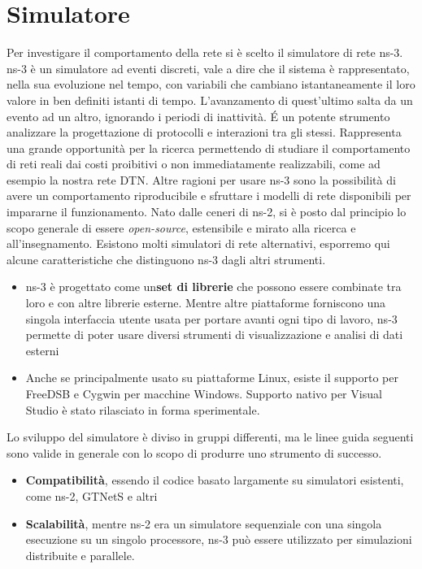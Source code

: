 \documentclass[12pt,a4paper,oneside]{book}
\begin{document}
		\section{Simulatore}
		Per investigare il comportamento della rete si è scelto il simulatore di rete ns-3. 
		ns-3 è un simulatore ad eventi discreti, vale a dire che il sistema è rappresentato, nella sua evoluzione nel tempo, con variabili che cambiano istantaneamente il loro valore in ben definiti istanti di tempo. L'avanzamento di quest'ultimo salta da un evento ad un altro, ignorando i periodi di inattività. \'E un potente strumento analizzare la progettazione di protocolli e interazioni tra gli stessi. Rappresenta una grande opportunità per la ricerca permettendo di studiare il comportamento di reti reali dai costi proibitivi o non immediatamente realizzabili, come ad esempio la nostra rete DTN. Altre ragioni per usare ns-3 sono la possibilità di avere un comportamento riproducibile e sfruttare i modelli di rete disponibili per impararne il funzionamento. Nato dalle ceneri di ns-2, si è posto dal principio lo scopo generale di essere {\it open-source}, estensibile e mirato alla ricerca e all'insegnamento.  Esistono molti simulatori di rete alternativi, esporremo qui alcune caratteristiche che distinguono ns-3 dagli altri strumenti.
		
		\begin{itemize}
			\item ns-3 è progettato come un{\bf set di librerie} che possono essere combinate tra loro e con altre librerie esterne. Mentre altre piattaforme forniscono una singola interfaccia utente usata per portare avanti ogni tipo di lavoro, ns-3 permette di poter usare diversi strumenti di visualizzazione e analisi di dati esterni
			
			\item Anche se principalmente usato su piattaforme Linux, esiste il supporto per FreeDSB e Cygwin per macchine Windows. Supporto nativo per Visual Studio è stato rilasciato in forma sperimentale. 
		\end{itemize}
		
		Lo sviluppo del simulatore è diviso in gruppi differenti, ma le linee guida seguenti sono valide in generale con lo scopo di produrre uno strumento di successo.
		\begin{itemize}
			\item {\bf Compatibilità}, essendo il codice basato largamente su simulatori esistenti, come ns-2, GTNetS e altri
			\item {\bf Scalabilità}, mentre ns-2 era un simulatore sequenziale con una singola esecuzione su un singolo processore, ns-3 può essere utilizzato per simulazioni distribuite e parallele. 
		\end{itemize}
\end{document}
